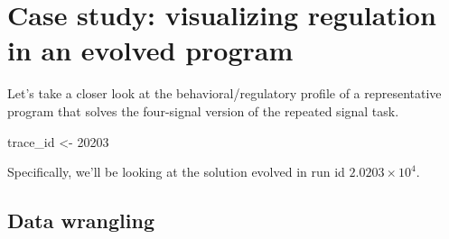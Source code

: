 \documentclass[
]{book}
\newenvironment{Shaded}{\begin{snugshade}}{\end{snugshade}}
\newcommand{\DecValTok}[1]{\textcolor[rgb]{0.00,0.00,0.81}{#1}}
\newcommand{\NormalTok}[1]{#1}
\newcommand{\StringTok}[1]{\textcolor[rgb]{0.31,0.60,0.02}{#1}}
\begin{document}
\hypertarget{case-study-visualizing-regulation-in-an-evolved-program}{%
\section{Case study: visualizing regulation in an evolved program}\label{case-study-visualizing-regulation-in-an-evolved-program}}

Let's take a closer look at the behavioral/regulatory profile of a representative program that solves the four-signal version of the repeated signal task.

\begin{Shaded}
\begin{Highlighting}[]
\NormalTok{trace\_id \textless{}{-}}\StringTok{ }\DecValTok{20203}
\end{Highlighting}
\end{Shaded}

Specifically, we'll be looking at the solution evolved in run id \ensuremath{2.0203\times 10^{4}}.

\hypertarget{data-wrangling}{%
\subsection{Data wrangling}\label{data-wrangling}}
\end{document}
